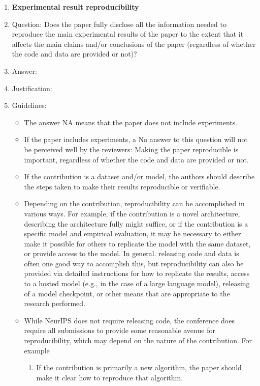\documentclass{article}
\begin{document}
\begin{enumerate}
    \item {\bf Experimental result reproducibility}
    \item[] Question: Does the paper fully disclose all the information needed to reproduce the main experimental results of the paper to the extent that it affects the main claims and/or conclusions of the paper (regardless of whether the code and data are provided or not)?
    \item[] Answer: \answerTODO{} %
    \item[] Justification: \justificationTODO{}
    \item[] Guidelines:
    \begin{itemize}
        \item The answer NA means that the paper does not include experiments.
        \item If the paper includes experiments, a No answer to this question will not be perceived well by the reviewers: Making the paper reproducible is important, regardless of whether the code and data are provided or not.
        \item If the contribution is a dataset and/or model, the authors should describe the steps taken to make their results reproducible or verifiable. 
        \item Depending on the contribution, reproducibility can be accomplished in various ways. For example, if the contribution is a novel architecture, describing the architecture fully might suffice, or if the contribution is a specific model and empirical evaluation, it may be necessary to either make it possible for others to replicate the model with the same dataset, or provide access to the model. In general. releasing code and data is often one good way to accomplish this, but reproducibility can also be provided via detailed instructions for how to replicate the results, access to a hosted model (e.g., in the case of a large language model), releasing of a model checkpoint, or other means that are appropriate to the research performed.
        \item While NeurIPS does not require releasing code, the conference does require all submissions to provide some reasonable avenue for reproducibility, which may depend on the nature of the contribution. For example
        \begin{enumerate}
            \item If the contribution is primarily a new algorithm, the paper should make it clear how to reproduce that algorithm.

\end{enumerate}
\end{itemize}
\end{enumerate}
\end{document}
